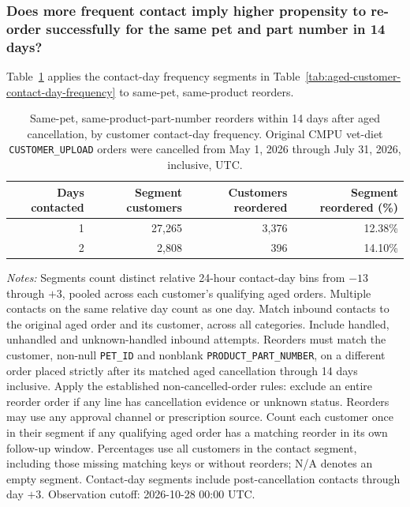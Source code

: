 
\subsubsection{Does more frequent contact imply higher propensity to re-order successfully for the same pet and part number in 14 days?}
Table~\ref{tab:contact-frequency-same-pet-part-reorders} applies the contact-day
frequency segments in Table~\ref{tab:aged-customer-contact-day-frequency}
to same-pet, same-product reorders.

\begin{table}[!htbp]
\centering
\caption{Same-pet, same-product-part-number reorders within 14 days after aged cancellation, by customer contact-day frequency. Original CMPU vet-diet \texttt{CUSTOMER\_UPLOAD} orders were cancelled from May 1, 2026 through July 31, 2026, inclusive, UTC.}
\label{tab:contact-frequency-same-pet-part-reorders}
\begin{tabular}{@{}rrrr@{}}
\toprule
Days contacted & Segment customers & Customers reordered & Segment reordered (\%) \\
\midrule
1 & 27,265 & 3,376 & 12.38\% \\
2 & 2,808 & 396 & 14.10\% \\
\bottomrule
\end{tabular}

\begin{minipage}{\linewidth}
\footnotesize
\textit{Notes:} Segments count distinct relative 24-hour contact-day bins from
$-13$ through $+3$, pooled across each customer's qualifying aged orders.
Multiple contacts on the same relative day count as one day. Match inbound
contacts to the original aged order and its customer, across all categories.
Include handled, unhandled and unknown-handled inbound attempts. Reorders must match the customer, non-null \texttt{PET\_ID} and nonblank
\texttt{PRODUCT\_PART\_NUMBER}, on a different order placed strictly after
its matched aged cancellation through 14 days inclusive. Apply the established
non-cancelled-order rules: exclude an entire reorder order if any line has
cancellation evidence or unknown status. Reorders may use any approval channel
or prescription source. Count each customer once in their segment if any
qualifying aged order has a matching reorder in its own follow-up window.
Percentages use all customers in the contact segment, including those missing
matching keys or without reorders; N/A denotes an empty segment. Contact-day
segments include post-cancellation contacts through day $+3$.
Observation cutoff: 2026-10-28 00:00 UTC.
\end{minipage}
\end{table}
